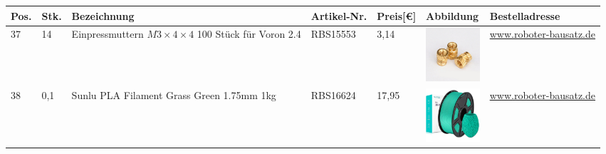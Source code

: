 \begin{center}
	\fontsize{8}{10}\selectfont
	\begin{tabularx}{\textwidth}{|p{0.4cm}|p{0.4cm}|X|X|p{1cm}|X|X|}
	\hline 
	\textbf{Pos.} & \textbf{Stk.} & \textbf{Bezeichnung} & \textbf{Artikel-Nr.}& \textbf{Preis[€]} & \textbf{Abbildung} & \textbf{Bestelladresse} \\ \hline		
	37 & 14 & Einpressmuttern $M3\times 4 \times 4$ 100 Stück für Voron 2.4 & RBS15553 & 3,14 & \includegraphics[width=2cm]{Images/Material/RBS15553.jpg} & \href{https://www.roboter-bausatz.de/p/einpressmuttern-m3x4x4-100-stueck-fuer-voron-2.4}{www.roboter-bausatz.de} \\
			\hline
	38 & 0,1 & Sunlu PLA Filament Grass Green 1.75mm 1kg & RBS16624 & 17,95   & \includegraphics[width=2cm]{Images/Material/RBS16624.jpg} & \href{https://www.roboter-bausatz.de/detail/index/sArticle/6689}{www.roboter-bausatz.de} \\ 
			\hline
			\end{tabularx}
\end{center}
